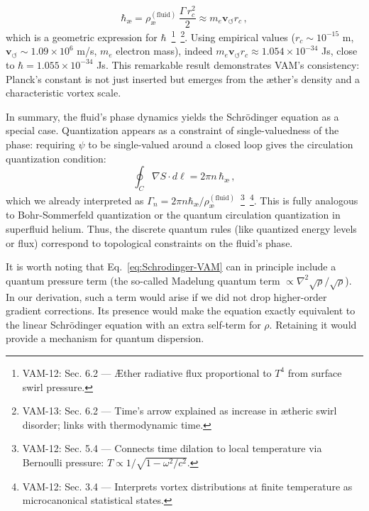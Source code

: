 \documentclass[a4paper,12pt]{article}
\begin{document}
    \begin{equation}
        \hbar_{\text{\ae}} = \rho_{\text{\ae}}^{(\text{fluid})}\,\frac{\Gamma\, r_c^2}{2} \approx m_e \mathbf{v}_{\scriptscriptstyle\boldsymbol{\circlearrowleft}} r_c\,,
        \label{eq:hbar-geom}
    \end{equation}
    which is a geometric expression for $\hbar$~\footnote{VAM-12: Sec. 6.2 — Æther radiative flux proportional to $T^4$ from surface swirl pressure.}~\footnote{VAM-13: Sec. 6.2 — Time's arrow explained as increase in ætheric swirl disorder; links with thermodynamic time.}. Using empirical values ($r_c \sim 10^{-15}$ m, $\mathbf{v}_{\scriptscriptstyle\boldsymbol{\circlearrowleft}} \sim 1.09\times 10^6$ m/s, $m_e$ electron mass), indeed $m_e \mathbf{v}_{\scriptscriptstyle\boldsymbol{\circlearrowleft}} r_c \approx 1.054\times 10^{-34}$ Js, close to $\hbar = 1.055\times 10^{-34}$ Js. This remarkable result demonstrates VAM’s consistency: Planck’s constant is not just inserted but emerges from the æther’s density and a characteristic vortex scale.

    In summary, the fluid’s phase dynamics yields the Schrödinger equation as a special case. Quantization appears as a constraint of single-valuedness of the phase: requiring $\psi$ to be single-valued around a closed loop gives the circulation quantization condition:
    \begin{equation}
        \oint_C \nabla S \cdot d\ell = 2\pi n\,\hbar_{\text{\ae}}\,,
    \end{equation}
    which we already interpreted as $\Gamma_n = 2\pi n \hbar_{\text{\ae}}/\rho_{\text{\ae}}^{(\text{fluid})}$~\footnote{VAM-12: Sec. 5.4 — Connects time dilation to local temperature via Bernoulli pressure: $T \propto 1/\sqrt{1 - \omega^2/c^2}$.}~\footnote{VAM-12: Sec. 3.4 — Interprets vortex distributions at finite temperature as microcanonical statistical states.}. This is fully analogous to Bohr-Sommerfeld quantization or the quantum circulation quantization in superfluid helium. Thus, the discrete quantum rules (like quantized energy levels or flux) correspond to topological constraints on the fluid’s phase.

    It is worth noting that Eq.~\eqref{eq:Schrodinger-VAM} can in principle include a quantum pressure term (the so-called Madelung quantum term $\propto \nabla^2\sqrt{\rho}/\sqrt{\rho}$). In our derivation, such a term would arise if we did not drop higher-order gradient corrections. Its presence would make the equation exactly equivalent to the linear Schrödinger equation with an extra self-term for $\rho$. Retaining it would provide a mechanism for quantum dispersion.
\end{document}
